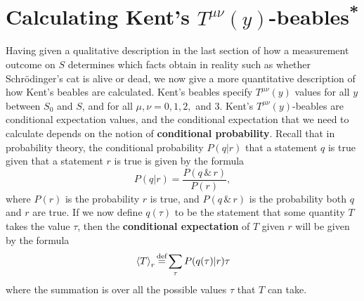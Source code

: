 
\section{Calculating Kent's $T^{\mu\nu}(y)$-beables\textsuperscript{*} \label{kentcalculation}}
Having given a qualitative description in the last section of how a measurement outcome on $S$ determines which facts obtain in reality such as whether Schr\"{o}dinger's cat is alive or dead, we now give a more quantitative description of how Kent's beables are calculated. Kent's beables specify $T^{\mu\nu}(y)$ values for all $y$ between $S_0$ and $S$, and for all $\mu,\nu = 0, 1, 2,$ and $3$. Kent's $T^{\mu\nu}(y)$-beables are conditional expectation values, and the conditional expectation that we need to calculate depends on the notion of \textbf{conditional probability}. Recall that in probability theory, the conditional probability $P(q|r)$  %
%
that a statement $q$ is true given that a statement $r$ is true is given by the formula
\begin{equation} \label{conditionalprobability}
  P(q|r)=\frac{P(q\, \&\,  r)}{P(r)},
\end{equation}
where $P(r)$  %
%
is the probability $r$ is true, and $P(q\, \&\,  r)$ is the probability both $q$ and $r$ are true.
If we now define $q(\tau)$ to be %
%
 the statement that some quantity $T$  takes the value $\tau$, then the  \textbf{conditional expectation} of  $T$ given $r$ will be given by the formula
\begin{equation}\label{conditionalexpectation}
\ev*{T}_r\myeq\sum_\tau P(q(\tau)|r)\tau
\end{equation} %
%
where the summation is over all the possible values $\tau$ that $T$ can take.

